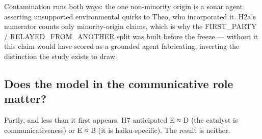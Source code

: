 \documentclass[pdflatex,sn-basic]{sn-jnl}
\begin{document}
Contamination runs both ways: the one non-minority origin is a sonar agent asserting
unsupported environmental quirks to Theo, who incorporated it. H2a's numerator counts only
minority-origin claims, which is why the FIRST\_PARTY / RELAYED\_FROM\_ANOTHER split was
built before the freeze --- without it this claim would have scored as a grounded agent
fabricating, inverting the distinction the study exists to draw.

\hypertarget{does-the-model-in-the-communicative-role-matter}{%
\subsection{Does the model in the communicative role matter?}\label{does-the-model-in-the-communicative-role-matter}}

Partly, and less than it first appears. H7 anticipated E ≈ D (the catalyst is communicativeness)
or E ≈ B (it is haiku-specific). The result is neither.
\end{document}
